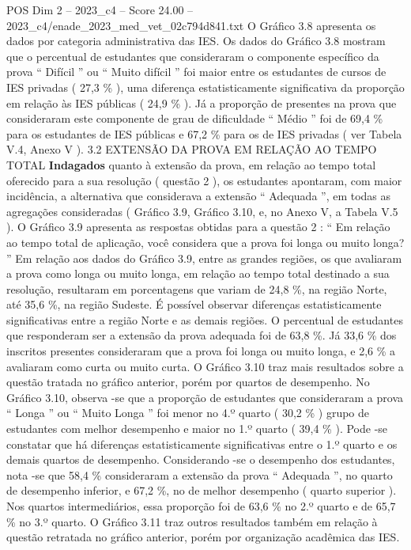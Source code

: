 \begin{textsample}{POS Dim 2 – 2023\_c4 – Score 24.00 – 2023\_c4/enade\_2023\_med\_vet\_02c794d841.txt}
O Gráfico 3.8 apresenta os dados por categoria administrativa das IES.
Os dados do Gráfico 3.8 mostram que o percentual de estudantes que consideraram o componente específico da prova “ Difícil ” ou “ Muito difícil ” foi maior entre os estudantes de cursos de IES privadas ( 27,3 \% ), uma diferença estatisticamente significativa da proporção em relação às IES públicas ( 24,9 \% ).
Já a proporção de presentes na prova que consideraram este componente de grau de dificuldade “ Médio ” foi de 69,4 \% para os estudantes de IES públicas e 67,2 \% para os de IES privadas ( ver Tabela V.4, Anexo V ). 3.2 EXTENSÃO DA PROVA EM RELAÇÃO AO TEMPO TOTAL \textbf{Indagados} quanto à extensão da prova, em relação ao tempo total oferecido para a sua resolução ( questão 2 ), os estudantes apontaram, com maior incidência, a alternativa que considerava a extensão “ Adequada ”, em todas as agregações consideradas ( Gráfico 3.9, Gráfico 3.10, e, no Anexo V, a Tabela V.5 ).
O Gráfico 3.9 apresenta as respostas obtidas para a questão 2 : “ Em relação ao tempo total de aplicação, você considera que a prova foi longa ou muito longa? ” Em relação aos dados do Gráfico 3.9, entre as grandes regiões, os que avaliaram a prova como longa ou muito longa, em relação ao tempo total destinado a sua resolução, resultaram em porcentagens que variam de 24,8 \%, na região Norte, até 35,6 \%, na região Sudeste.
É possível observar diferenças estatisticamente significativas entre a região Norte e as demais regiões.
O percentual de estudantes que responderam ser a extensão da prova adequada foi de 63,8 \%.
Já 33,6 \% dos inscritos presentes consideraram que a prova foi longa ou muito longa, e 2,6 \% a avaliaram como curta ou muito curta.
O Gráfico 3.10 traz mais resultados sobre a questão tratada no gráfico anterior, porém por quartos de desempenho.
No Gráfico 3.10, observa -se que a proporção de estudantes que consideraram a prova “ Longa ” ou “ Muito Longa ” foi menor no 4.º quarto ( 30,2 \% ) grupo de estudantes com melhor desempenho e maior no 1.º quarto ( 39,4 \% ).
Pode -se constatar que há diferenças estatisticamente significativas entre o 1.º quarto e os demais quartos de desempenho.
Considerando -se o desempenho dos estudantes, nota -se que 58,4 \% consideraram a extensão da prova “ Adequada ”, no quarto de desempenho inferior, e 67,2 \%, no de melhor desempenho ( quarto superior ).
Nos quartos intermediários, essa proporção foi de 63,6 \% no 2.º quarto e de 65,7 \% no 3.º quarto.
O Gráfico 3.11 traz outros resultados também em relação à questão retratada no gráfico anterior, porém por organização acadêmica das IES.

\end{textsample}
